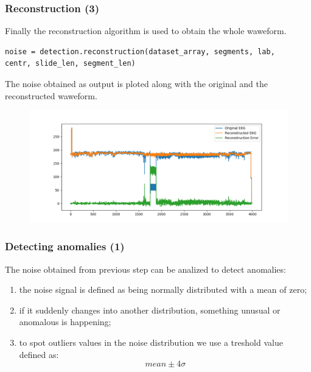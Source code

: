 \documentclass[xcolor ={table,usenames,dvipsnames}]{beamer}
\theoremstyle{definition}
\begin{document}
	\begin{frame}[fragile]
		\frametitle{Reconstruction (3)}
		Finally the reconstruction algorithm is used to obtain the whole waweform. 
		
		\begin{lstlisting}
noise = detection.reconstruction(dataset_array, segments, lab, 
centr, slide_len, segment_len)
		\end{lstlisting}
		The noise obtained as output is ploted along with the original and the reconstructed waweform.
		
		\begin{figure}[h!]
			\centering
			\includegraphics[scale=0.3]{img/noise.png}
		\end{figure}
	\end{frame}

	\begin{frame}
		\frametitle{Detecting anomalies (1)}
		The noise obtained from previous step can be analized to detect anomalies:
		\begin{enumerate}
			\item the noise signal is defined as being normally distributed with a mean of zero;
			\item if it suddenly changes into another distribution, something unusual or anomalous is happening;
			\item to spot outliers values in the noise distribution we use a treshold value defined as:
				$$ mean \pm 4\sigma $$
		\end{enumerate}
	\end{frame}
\end{document}
